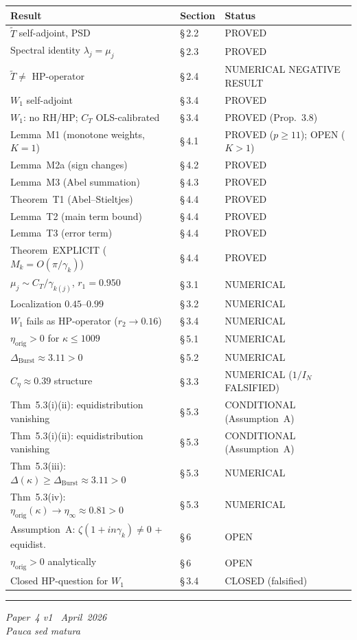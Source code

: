 \documentclass[11pt]{article}
\newcommand{\etaorig}{\eta_{\mathrm{orig}}}
\newcommand{\Tt}{\widetilde{T}}
\newcommand{\Ceta}{C_{\eta}}
\newcommand{\CT}{C_{T}}
\newcommand{\Wone}{W_1}
\newcommand{\Dburstvar}{\Delta_{\mathrm{Burst}}}
\begin{document}
\begin{center}
\renewcommand{\arraystretch}{1.2}
\begin{tabular}{lll}
\toprule
Result & Section & Status \\
\midrule
$\Tt$ self-adjoint, PSD & \S\,2.2 & PROVED \\
Spectral identity $\lambda_j=\mu_j$ & \S\,2.3 & PROVED \\
$\Tt\neq$ HP-operator & \S\,2.4 & NUMERICAL NEGATIVE RESULT \\
$\Wone$ self-adjoint & \S\,3.4 & PROVED \\
$\Wone$: no RH/HP; $\CT$ OLS-calibrated & \S\,3.4 & PROVED (Prop.~3.8) \\
Lemma~M1 (monotone weights, $K=1$) & \S\,4.1 & PROVED ($p\geq 11$); OPEN ($K>1$) \\
Lemma~M2a (sign changes) & \S\,4.2 & PROVED \\
Lemma~M3 (Abel summation) & \S\,4.3 & PROVED \\
Theorem~T1 (Abel--Stieltjes) & \S\,4.4 & PROVED \\
Lemma~T2 (main term bound) & \S\,4.4 & PROVED \\
Lemma~T3 (error term) & \S\,4.4 & PROVED \\
Theorem~EXPLICIT ($M_k=O(\pi/\gamma_k)$) & \S\,4.4 & PROVED \\
$\mu_j\sim\CT/\gamma_{k(j)}$, $r_1=0.950$ & \S\,3.1 & NUMERICAL \\
Localization $0.45$--$0.99$ & \S\,3.2 & NUMERICAL \\
$\Wone$ fails as HP-operator ($r_2\to 0.16$) & \S\,3.4 & NUMERICAL \\
$\etaorig > 0$ for $\kappa\leq 1009$ & \S\,5.1 & NUMERICAL \\
$\Dburstvar\approx 3.11 > 0$ & \S\,5.2 & NUMERICAL \\
$\Ceta\approx 0.39$ structure & \S\,3.3 & NUMERICAL ($1/I_N$ FALSIFIED) \\
Thm~5.3(i)(ii): equidistribution vanishing & \S\,5.3 & CONDITIONAL (Assumption~A) \\
Thm~5.3(i)(ii): equidistribution vanishing & \S\,5.3 & CONDITIONAL (Assumption~A) \\
Thm~5.3(iii): $\Delta(\kappa)\geq\Dburstvar\approx 3.11 > 0$
  & \S\,5.3 & NUMERICAL \\
Thm~5.3(iv): $\etaorig(\kappa)\to\eta_\infty\approx 0.81 > 0$
  & \S\,5.3 & NUMERICAL \\
Assumption~A: $\zeta(1+in\gamma_k)\neq 0$ + equidist. & \S\,6 & OPEN \\
$\etaorig > 0$ analytically & \S\,6 & OPEN \\
Closed HP-question for $\Wone$ & \S\,3.4 & CLOSED (falsified) \\
\bottomrule
\end{tabular}
\end{center}

\bigskip
\hrule
\smallskip
\noindent\small
\emph{Paper~4 v1 \textperiodcentered\ April~2026}\\
\emph{Pauca sed matura}
\end{document}
